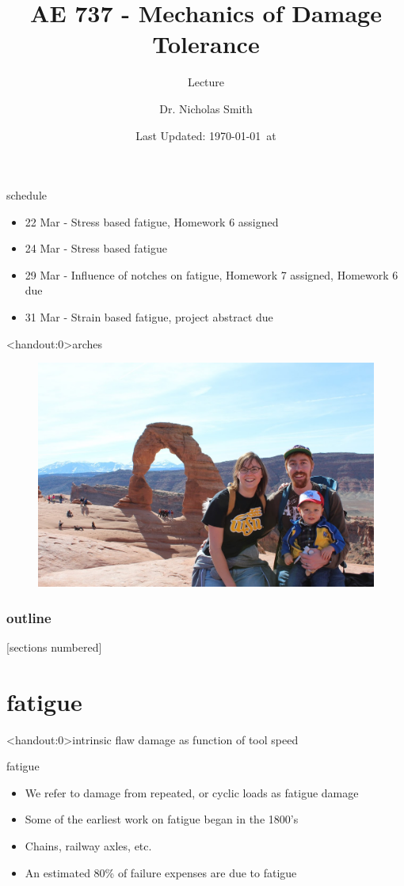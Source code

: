 \documentclass[10pt]{beamer}
\title{AE 737 - Mechanics of Damage Tolerance}
\subtitle{Lecture \arabic{lecture}}
\date{Last Updated: \today\ at \DTMcurrenttime}
\author{Dr. Nicholas Smith}
\institute{Wichita State University, Department of Aerospace Engineering}
\begin{document}
\maketitle
\begin{frame}{schedule}
	\begin{itemize}
		\item 22 Mar - Stress based fatigue, Homework 6 assigned
		\item 24 Mar - Stress based fatigue
		\item 29 Mar - Influence of notches on fatigue, Homework 7 assigned, Homework 6 due
		\item 31 Mar - Strain based fatigue, project abstract due
	\end{itemize}
\end{frame}

\begin{frame}<handout:0>{arches}
	\begin{figure}
	\centering
	\includegraphics[width=0.7\linewidth]{../Figures/delicate_fam}
	\label{fig:delicate_fam}
	\end{figure}
\end{frame}

\begin{frame}
  \frametitle{outline}
  [sections numbered]
  \tableofcontents[hideallsubsections]
\end{frame}

\section{fatigue}

\begin{frame}<handout:0>{intrinsic flaw}
	damage as function of tool speed
\end{frame}

\begin{frame}{fatigue}
	\begin{itemize}
		\item We refer to damage from repeated, or cyclic loads as fatigue damage
		\item Some of the earliest work on fatigue began in the 1800's
		\item Chains, railway axles, etc.
		\item An estimated 80\% of failure expenses are due to fatigue
	\end{itemize}
\end{frame}
\end{document}
